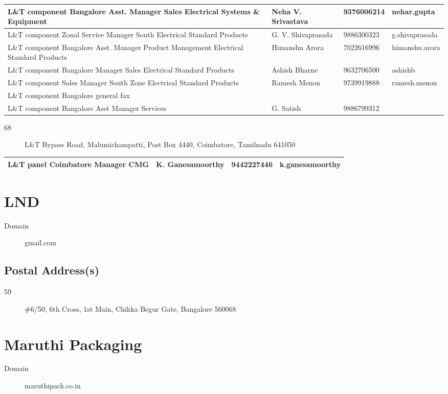 \documentclass[a4paper, 11pt, twoside]{book}
\begin{document}
\begin{tabular}{|p{4cm}|p{2cm}|p{2cm}|p{3cm}|}
\hline
L\&T component Bangalore Asst. Manager Sales Electrical Systems \& Equipment & Neha V. Srivastava & 9376006214 & nehar.gupta \\ \hline
L\&T component Zonal Service Manager South Electrical Standard Products & G. V. Shivaprasada & 9886300323 & g.shivaprasada \\ \hline
L\&T component Bangalore Asst. Manager Product Management Electrical Standard Products & Himanshu Arora & 7022616996 & himanshu.arora \\ \hline
L\&T component Bangalore Manager Sales Electrical Standard Products & Ashish Bharne & 9632706500 & ashishb \\ \hline
L\&T component Sales Manager South Zone Electrical Standard Products & Ramesh Menon & 9739919888 & ramesh.menon \\ \hline
L\&T component Bangalore general fax & & &  \\ \hline
L\&T component Bangalore Asst Manager Services & G. Satish & 9886799312 &  \\ \hline
\end{tabular}
\begin{description}
\item [68]L\&T Bypass Road, Malumichampatti, Post Box 4440, Coimbatore, Tamilnadu 641050
\end{description}
\begin{tabular}{|p{4cm}|p{2cm}|p{2cm}|p{3cm}|}
\hline
L\&T panel Coimbatore Manager CMG & K. Ganesamoorthy & 9442227446 & k.ganesamoorthy \\ \hline
\end{tabular}
\section{LND}\label{com:41}
\begin{description}
\item[Domain]gmail.com
\end{description}
\subsection*{Postal Address(s)}
\begin{description}
\item [59]\#6/50, 6th Cross, 1st Main, Chikka Begur Gate, Bangalore 560068
\end{description}
\section{Maruthi Packaging}\label{com:56}
\begin{description}
\item[Domain]maruthipack.co.in
\end{description}
\end{document}
